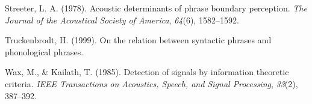 \documentclass[12pt,oneside]{book}
\begin{document}
\leavevmode\hypertarget{ref-streeter1978acoustic}{}%
Streeter, L. A. (1978). Acoustic determinants of phrase boundary perception. \emph{The Journal of the Acoustical Society of America}, \emph{64}(6), 1582--1592.

\leavevmode\hypertarget{ref-Truckenbrodt1999-vd}{}%
Truckenbrodt, H. (1999). On the relation between syntactic phrases and phonological phrases.

\leavevmode\hypertarget{ref-wax1985detection}{}%
Wax, M., \& Kailath, T. (1985). Detection of signals by information theoretic criteria. \emph{IEEE Transactions on Acoustics, Speech, and Signal Processing}, \emph{33}(2), 387--392.
\end{document}

